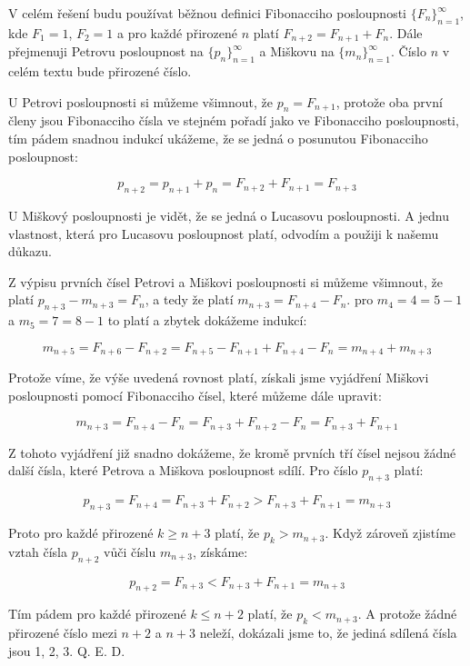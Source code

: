\documentclass{fkssolpub}
\author{Ondřej Sedláček}
\begin{document}
 

V celém řešení budu používat běžnou definici Fibonacciho posloupnosti
$\{F_n\}_{n=1}^{\infty}$, kde $F_1 = 1$, $F_2 = 1$ a pro každé přirozené
$n$ platí $F_{n+2} = F_{n+1} + F_n$. Dále přejmenuji Petrovu posloupnost
na $\{p_n\}_{n=1}^{\infty}$ a Miškovu na $\{m_n\}_{n=1}^{\infty}$.
Číslo $n$ v celém textu bude přirozené číslo.

U Petrovi posloupnosti si můžeme všimnout, že $p_n = F_{n+1}$, protože
oba první členy jsou Fibonacciho čísla ve stejném pořadí jako ve Fibonacciho
posloupnosti, tím pádem snadnou indukcí ukážeme, že se jedná o posunutou
Fibonacciho posloupnost:

\[
  p_{n+2} = p_{n+1} + p_n = F_{n+2} + F_{n+1} = F_{n+3}
\]

U Miškový posloupnosti je vidět, že se jedná o Lucasovu posloupnosti. A
jednu vlastnost, která pro Lucasovu posloupnost platí, odvodím a použiji
k našemu důkazu.

Z výpisu prvních čísel Petrovi a Miškovi posloupnosti si můžeme všimnout,
že platí $p_{n+3} - m_{n+3} = F_n$, a tedy že platí $m_{n+3} = F_{n+4} - F_n$. 
pro $m_4 = 4 = 5 - 1$ a $m_5 = 7 = 8 - 1$ to platí a zbytek dokážeme indukcí:

\[
  m_{n + 5} = F_{n+6} - F_{n+2} = F_{n+5} - F_{n+1} + F_{n+4} - F_{n}
    = m_{n+4} + m_{n+3}
\]

Protože víme, že výše uvedená rovnost platí, získali jsme vyjádření Miškovi
posloupnosti pomocí Fibonacciho čísel, které můžeme dále upravit:

\[
  m_{n+3} = F_{n+4} - F_n = F_{n+3} + F_{n+2} - F_n = F_{n+3} + F_{n+1}
\]

Z tohoto vyjádření již snadno dokážeme, že kromě prvních tří čísel
nejsou žádné další čísla, které Petrova a Miškova posloupnost sdílí.
Pro číslo $p_{n+3}$ platí:

\[
  p_{n+3} = F_{n+4} = F_{n + 3} + F_{n+2} > F_{n+3}+F_{n+1} = m_{n+3}
\]

Proto pro každé přirozené $k \geq n+3$ platí, že $p_k > m_{n+3}$. Když
zároveň zjistíme vztah čísla $p_{n+2}$ vůči číslu $m_{n+3}$, získáme:

\[
  p_{n+2} = F_{n+3} < F_{n+3} + F_{n+1} = m_{n+3}
\]

Tím pádem pro každé přirozené $k \leq n+2$ platí, že $p_k < m_{n+3}$.
A protože žádné přirozené číslo mezi $n+2$ a $n+3$ neleží, dokázali jsme
to, že jediná sdílená čísla jsou 1, 2, 3. Q. E. D.
\end{document}

